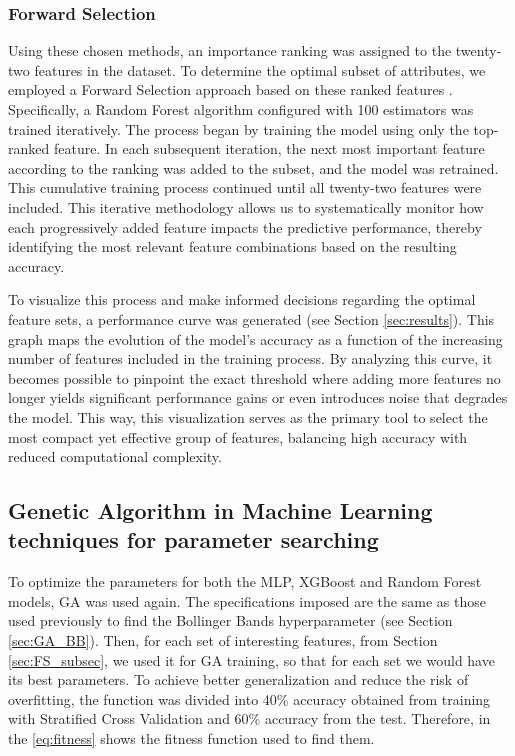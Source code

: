 \documentclass{ieeeaccess}
\begin{document}
\subsubsection{Forward Selection}

Using these chosen methods, an importance ranking was assigned to the twenty-two features in the dataset. To determine the optimal subset of attributes, we employed a Forward Selection approach based on these ranked features \cite{dejean2020forward}. Specifically, a Random Forest algorithm configured with 100 estimators was trained iteratively. The process began by training the model using only the top-ranked feature. In each subsequent iteration, the next most important feature according to the ranking was added to the subset, and the model was retrained. This cumulative training process continued until all twenty-two features were included. This iterative methodology allows us to systematically monitor how each progressively added feature impacts the predictive performance, thereby identifying the most relevant feature combinations based on the resulting accuracy.

To visualize this process and make informed decisions regarding the optimal feature sets, a performance curve was generated (see Section \ref{sec:results}). This graph maps the evolution of the model's accuracy as a function of the increasing number of features included in the training process. By analyzing this curve, it becomes possible to pinpoint the exact threshold where adding more features no longer yields significant performance gains or even introduces noise that degrades the model. This way, this visualization serves as the primary tool to select the most compact yet effective group of features, balancing high accuracy with reduced computational complexity.

\subsection{Genetic Algorithm in Machine Learning techniques for parameter searching}

To optimize the parameters for both the MLP, XGBoost and Random Forest models, GA was used again. The specifications imposed are the same as those used previously to find the Bollinger Bands hyperparameter (see Section \ref{sec:GA_BB}). Then, for each set of interesting features, from Section \ref{sec:FS_subsec}, we used it for GA training, so that for each set we would have its best parameters. To achieve better generalization and reduce the risk of overfitting, the function was divided into 40\% accuracy obtained from training with Stratified Cross Validation and 60\% accuracy from the test. Therefore, in the \eqref{eq:fitness} shows the fitness function used to find them.
\end{document}

